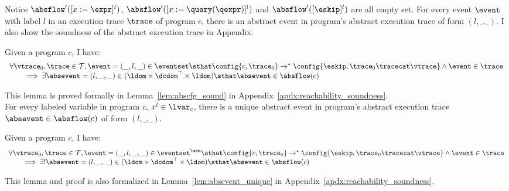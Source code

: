    Notice $\absflow'([x := \expr]^{l})$, $\absflow'([x := \query(\qexpr)]^{l})$ and $\absflow'([\eskip]^{l})$ are all empty set. 
   For every event $\event$ with label $l$ in an execution trace $\trace$ of program $c$, 
   there is an abstract event in program's abstract execution trace of form $(l, \_, \_)$.  
    I also show the soundness of the abstract execution trace in Appendix.
   \begin{lem}
     \label{lem:abscfg_sound}
   Given a program ${c}$, I have:
   \[
     \begin{array}{l}
       \forall \vtrace_0, \trace \in \mathcal{T} ,  \event = (\_, l, \_) \in \eventset \sthat 
   \config{{c}, \trace_0} \to^{*} \config{\eskip, \trace_0 \tracecat \vtrace} 
   \land \event \in \trace 
   \\
   \qquad \implies \exists \absevent = (l, \_, \_) \in (\ldom\times \dcdom^{\top} \times \ldom) \sthat  
   \absevent \in \absflow(c)
   \end{array}
   \]
   \end{lem}
This lemma is proved formally in Lemma~\ref{lem:abscfg_sound} in Appendix~\ref{apdx:reachability_soundness}.
\\
For every labeled variable in program $c$, $x^l \in \lvar_c$, there is a unique abstract event in program's abstract execution trace $\absevent \in \absflow(c)$ of form $(l, \_, \_)$. 
\begin{lem}
  \label{lem:abscfg_unique}
Given a program ${c}$, I have:
%
\[
  \begin{array}{l}
    \forall \vtrace_0, \trace \in \mathcal{T} ,  \event = (\_, l, \_, \_) \in \eventset^{\asn} \sthat 
\config{{c}, \trace_0} \to^{*} \config{\eskip, \trace_0 \tracecat \vtrace} 
\land \event \in \trace 
\\
\qquad \implies \exists! \absevent = (l, \_, \_) \in (\ldom\times \dcdom^{\top} \times \ldom) \sthat  
\absevent \in \absflow(c)
\end{array}
\]
\end{lem}
This lemma and proof is also 
formalized in Lemma~\ref{lem:absevent_unique} in Appendix~\ref{apdx:reachability_soundness}.

